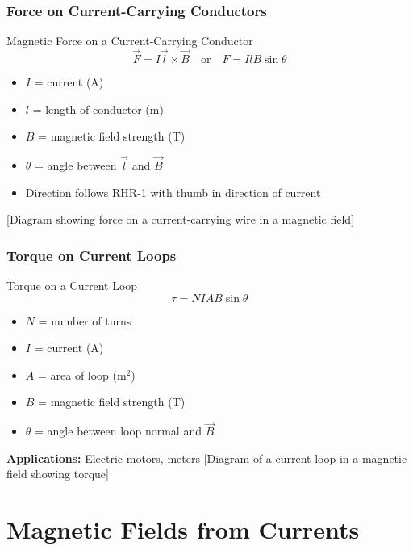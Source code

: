 \documentclass{beamer}
\begin{document}
\begin{frame}
\frametitle{Force on Current-Carrying Conductors}
\begin{block}{Magnetic Force on a Current-Carrying Conductor}
\begin{equation}
\vec{F} = I\vec{l} \times \vec{B} \quad \text{or} \quad F = IlB\sin\theta
\end{equation}
\end{block}
\begin{itemize}
    \item $I$ = current (A)
    \item $l$ = length of conductor (m)
    \item $B$ = magnetic field strength (T)
    \item $\theta$ = angle between $\vec{l}$ and $\vec{B}$
    \item Direction follows RHR-1 with thumb in direction of current
\end{itemize}
\alert{[Diagram showing force on a current-carrying wire in a magnetic field]}
\end{frame}

\begin{frame}
\frametitle{Torque on Current Loops}
\begin{block}{Torque on a Current Loop}
\begin{equation}
\tau = NIAB\sin\theta
\end{equation}
\end{block}

\begin{itemize}
    \item $N$ = number of turns
    \item $I$ = current (A)
    \item $A$ = area of loop (m$^2$)
    \item $B$ = magnetic field strength (T)
    \item $\theta$ = angle between loop normal and $\vec{B}$
\end{itemize}

\textbf{Applications:} Electric motors, meters
\alert{[Diagram of a current loop in a magnetic field showing torque]}
\end{frame}

\section{Magnetic Fields from Currents}
\end{document}
